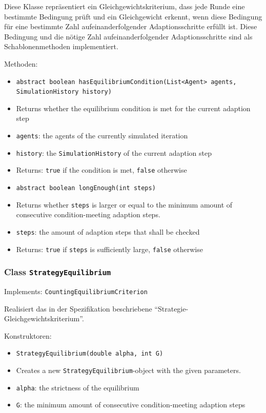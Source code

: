 \documentclass[parskip=full,11pt]{scrartcl}
\begin{document}
Diese Klasse repräsentiert ein Gleichgewichtskriterium, dass jede Runde eine bestimmte Bedingung prüft und ein Gleichgewicht erkennt, wenn diese Bedingung für eine bestimmte Zahl aufeinanderfolgender Adaptionsschritte erfüllt ist. Diese Bedingung und die nötige Zahl aufeinanderfolgender Adaptionsschritte sind als Schablonenmethoden implementiert.

Methoden:
\begin{itemize}\itemsep -10pt
\item \texttt{abstract boolean hasEquilibriumCondition(List<Agent> agents, SimulationHistory history)}
\item[] Returns whether the equilibrium condition is met for the current adaption step
\item[] \texttt{agents}: the agents of the currently simulated iteration
\item[] \texttt{history}: the \texttt{SimulationHistory} of the current adaption step
\item[] Returns: \texttt{true} if the condition is met, \texttt{false} otherwise

\item \texttt{abstract boolean longEnough(int steps)}
\item[] Returns whether \texttt{steps} is larger or equal to the minimum amount of consecutive condition-meeting adaption steps.
\item[] \texttt{steps}: the amount of adaption steps that shall be checked
\item[] Returns: \texttt{true} if \texttt{steps} is sufficiently large, \texttt{false} otherwise
\end{itemize}

\subsubsection{Class \texttt{StrategyEquilibrium}}
Implements: \texttt{CountingEquilibriumCriterion}

Realisiert das in der Spezifikation beschriebene \enquote{Strategie-Gleichgewichtskriterium}.

Konstruktoren:
\begin{itemize}\itemsep -10pt
\item \texttt{StrategyEquilibrium(double alpha, int G)}
\item[] Creates a new \texttt{StrategyEquilibrium}-object with the given parameters.
\item[] \texttt{alpha}: the strictness of the equilibrium
\item[] \texttt{G}: the minimum amount of consecutive condition-meeting adaption steps
\end{itemize}
\end{document}
